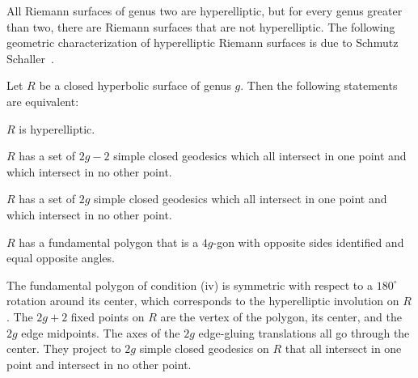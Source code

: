 \documentclass[Thesis]{subfiles}
\begin{document}
All Riemann surfaces of genus two are hyperelliptic, but for
every genus greater than two, there are Riemann surfaces that are not
hyperelliptic. The following geometric characterization of
hyperelliptic Riemann surfaces is due to Schmutz
Schaller~\cite{schmutz1998, schmutz1999}.

\begin{theorem}
  \label{thm:schmutz_schaller}
  Let $R$ be a closed hyperbolic surface of genus $g$. Then the
  following statements are equivalent:
  \begin{compactenum}[(i)]
  \item $R$ is hyperelliptic.
  \item $R$ has a set of $2g-2$ simple closed geodesics which all
    intersect in one point and which intersect in no other point.
  \item $R$ has a set of $2g$ simple closed geodesics which all
    intersect in one point and which intersect in no other point.
  \item $R$ has a fundamental polygon that is a $4g$-gon with opposite
    sides identified and equal opposite angles.
  \end{compactenum}
\end{theorem}

The fundamental polygon of condition (iv) is symmetric with respect
to a $180^{\circ}$ rotation around its center, which corresponds to
the hyperelliptic involution on $R$. The $2g+2$ fixed points on $R$
are the vertex of the polygon, its center, and the $2g$ edge
midpoints. The axes of the $2g$ edge-gluing translations all go
through the center. They project to $2g$ simple closed
geodesics on $R$ that all intersect in one point and intersect in no
other point.


\end{document}
